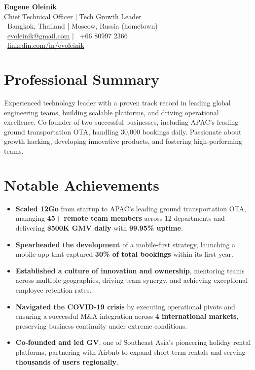 \documentclass[11pt,a4paper]{article}
\begin{document}
\begin{center}
    \colorbox{headerbg}{\parbox{\textwidth}{
        \vspace{0.5em}
        {\Huge\textbf{Eugene Oleinik}} \\[0.3em]
        {\Large\color{secondarycolor} Chief Technical Officer | Tech Growth Leader} \\[0.5em]
        {\color{secondarycolor}
        \faMapMarker \, Bangkok, Thailand | Moscow, Russia (hometown) \\[0.2em]
        \faEnvelope \, \href{mailto:evoleinik@gmail.com}{evoleinik@gmail.com} | \faPhone \, +66 80997 2366 \\[0.2em]
        \faLinkedin \, \href{http://linkedin.com/in/evoleinik}{linkedin.com/in/evoleinik}}
        \vspace{0.5em}
    }}
\end{center}


\section*{Professional Summary}
{
Experienced technology leader with a proven track record in leading global engineering teams, building scalable platforms, and driving operational excellence. Co-founder of two successful businesses, including APAC's leading ground transportation OTA, handling 30,000 bookings daily. Passionate about growth hacking, developing innovative products, and fostering high-performing teams.}

\section*{Notable Achievements}
\begin{itemize}
    \item \textbf{Scaled 12Go} from startup to APAC's leading ground transportation OTA, managing \textbf{45+ remote team members} across 12 departments and delivering \textbf{\$500K GMV daily} with \textbf{99.95\% uptime}.
    \item \textbf{Spearheaded the development} of a mobile-first strategy, launching a mobile app that captured \textbf{30\% of total bookings} within its first year.
    \item \textbf{Established a culture of innovation and ownership}, mentoring teams across multiple geographies, driving team synergy, and achieving exceptional employee retention rates.
    \item \textbf{Navigated the COVID-19 crisis} by executing operational pivots and ensuring a successful M\&A integration across \textbf{4 international markets}, preserving business continuity under extreme conditions.
    \item \textbf{Co-founded and led GV}, one of Southeast Asia's pioneering holiday rental platforms, partnering with Airbnb to expand short-term rentals and serving \textbf{thousands of users regionally}.
\end{itemize}
\end{document}
